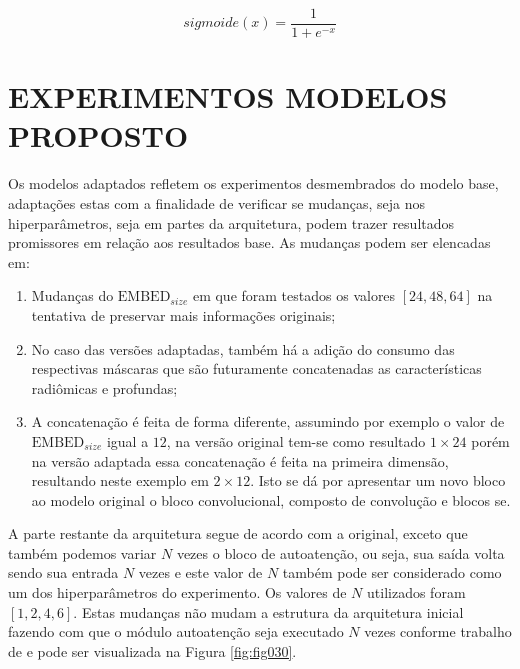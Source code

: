 \begin{equation}
\textit{sigmoide}(x) = \frac{1}{1 + e^{-x}}
\label{eq:sigmoide}
\end{equation}

\section{EXPERIMENTOS MODELOS PROPOSTO}
\label{sec:cap5_experimentos_adaptados}

Os modelos adaptados refletem os experimentos desmembrados do modelo base, adaptações estas com a finalidade de verificar se mudanças, seja nos hiperparâmetros, seja em partes da arquitetura, podem trazer resultados promissores em relação aos resultados base. As mudanças podem ser elencadas em: 

\begin{enumerate}

\item Mudanças do $\text{EMBED}_{size}$ em que foram testados os valores $[24, 48, 64]$ na tentativa de preservar mais informações originais;

\item No caso das versões adaptadas, também há a adição do consumo das respectivas máscaras que são futuramente concatenadas as características radiômicas e profundas;

\item A concatenação é feita de forma diferente, assumindo por exemplo o valor de $\text{EMBED}_{size}$ igual a $12$, na versão original tem-se como resultado $1\times24$ porém na versão adaptada essa concatenação é feita na primeira dimensão, resultando neste exemplo em $2\times12$. Isto se dá por apresentar um novo bloco ao modelo original o bloco convolucional, composto de convolução e blocos \gls{se}.

\end{enumerate}


A parte restante da arquitetura segue de acordo com a original, exceto que também podemos variar $N$ vezes o bloco de autoatenção, ou seja, sua saída volta sendo sua entrada $N$ vezes e este valor de $N$ também pode ser considerado como um dos hiperparâmetros do experimento. Os valores de $N$ utilizados foram $[1, 2, 4, 6]$. Estas mudanças não mudam a estrutura da arquitetura inicial fazendo com que o módulo autoatenção seja executado $N$ vezes conforme trabalho de \cite{vaswaniAttentionAllYou2023} e pode ser visualizada na Figura \ref{fig:fig030}.

